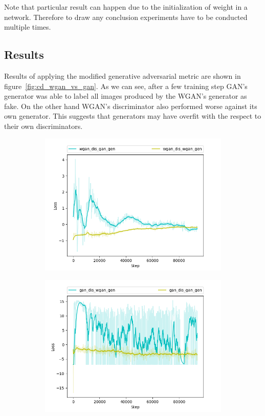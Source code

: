 Note that particular result can happen due to the initialization of weight in a network. Therefore to draw any conclusion experiments have to be conducted multiple times. 

\subsection{Results}
 Results of applying the modified generative adversarial metric are shown in figure~\ref{fig:cd_wgan_vs_gan}. As we can see, after a few training step GAN's generator was able to label all images produced by the WGAN's generator as fake. On the other hand WGAN's discriminator also performed worse against its own generator. This suggests that generators may have overfit with the respect to their own discriminators. 
\begin{figure}[h]
	\begin{subfigure}[b]{0.5\textwidth}
		\includegraphics[width=\textwidth]{figures/wgan_dis_gan_gen}
	\end{subfigure}
	\begin{subfigure}[b]{0.5\textwidth}
		\includegraphics[width=\textwidth]{figures/gan_dis_wgan_gen}

\end{subfigure}
\end{figure}
